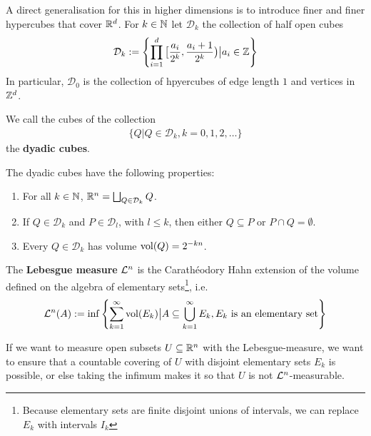 A direct generalisation for this in higher dimensions is to introduce finer and finer hypercubes that cover $\mathbb{R}^{d}$.
For $k \in \mathbb{N}$ let $\mathcal{D}_k$ the collection of half open cubes
\begin{align*}
  \mathcal{D}_k := \left\{
  \prod_{i=1}^{d}\big[\frac{a_i}{2^{k}}, \frac{a_{i}+1}{2^{k}}\big) \big\vert a_i \in \mathbb{Z}
  \right\}
\end{align*}  
In particular, $\mathcal{D}_0$ is the collection of hpyercubes of edge length $1$ and vertices in $\mathbb{Z}^d$.

We call the cubes of the collection
\begin{align*}
  \{Q \big\vert Q \in \mathcal{D}_k, k = 0,1,2, \ldots\}
\end{align*}
the \textbf{dyadic cubes}.

\begin{rem}
The dyadic cubes have the following properties:
\begin{enumerate}
  \item For all $k \in \mathbb{N}$, $\mathbb{R}^{n} = \bigsqcup_{Q \in \mathcal{D}_k}Q$.
  \item If $Q \in \mathcal{D}_k$ and $P \in \mathcal{D}_l$, with $l \leq k$, then either $Q \subseteq P$ or $P \cap Q = \emptyset$.
  \item Every $Q \in \mathcal{D}_k$ has volume $\operatorname{vol}(Q) = 2^{-kn}$.
\end{enumerate}
\end{rem}


\begin{dfn}[]
  The \textbf{Lebesgue measure} $\mathcal{L}^{n}$ is the Carathéodory Hahn extension of the volume defined on the algebra of elementary sets\footnote{Because elementary sets are finite disjoint unions of intervals, we can replace $E_k$ with intervals $I_k$}, i.e.
\begin{align*}
  \mathcal{L}^{n}(A) := \inf \left\{
    \sum_{k=1}^{\infty} \operatorname{vol}(E_k) \big\vert A \subseteq \bigcup_{k=1}^{\infty} E_k, E_k \text{ is an elementary set}
  \right\}
\end{align*}
\end{dfn}

If we want to measure open subsets $U \subseteq \mathbb{R}^{n}$ with the Lebesgue-measure, we want to ensure that a countable covering of $U$ with disjoint elementary sets $E_k$ is possible, or else taking the infimum makes it so that $U$ is not $\mathcal{L}^{n}$-measurable.

